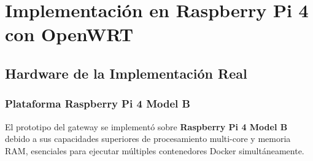 \section{Implementación en Raspberry Pi 4 con OpenWRT}

\subsection{Hardware de la Implementación Real}

\subsubsection{Plataforma Raspberry Pi 4 Model B}

El prototipo del gateway se implementó sobre \textbf{Raspberry Pi 4 Model B} debido a sus capacidades superiores de procesamiento multi-core y memoria RAM, esenciales para ejecutar múltiples contenedores Docker simultáneamente.

